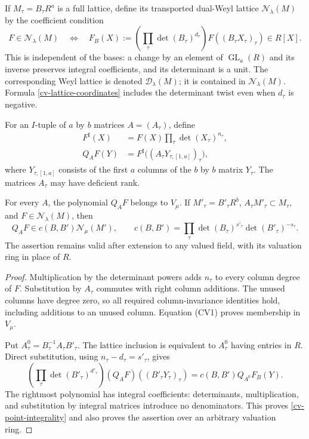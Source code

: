 If $M_\tau=B_\tau R^a$ is a full lattice, define its transported
dual-Weyl lattice $\mathcal N_\lambda(M)$ by the coefficient condition
\begin{equation}\label{cv-lattice-coordinates}
 F\in\mathcal N_\lambda(M)
 \quad\Longleftrightarrow\quad
 F_B(X):=\left(\prod_\tau\det(B_\tau)^{d_\tau}\right)
                       F((B_\tau X_\tau)_\tau)\in R[X].
\end{equation}
This is independent of the bases: a change by an element of
$\operatorname{GL}_a(R)$ and its inverse preserves integral
coefficients, and its determinant is a unit.  The corresponding Weyl
lattice is denoted $\mathcal D_\lambda(M)$; it is contained in
$\mathcal N_\lambda(M)$.  Formula
\eqref{cv-lattice-coordinates} includes the determinant twist even
when $d_\tau$ is negative.

For an $I$-tuple of $a$ by $b$ matrices $A=(A_\tau)$, define
\begin{equation}\label{cv-point-substitution}
 \begin{split}
 F^\sharp(X)&=F(X)\prod_\tau\det(X_\tau)^{n_\tau},\\
 Q_A F(Y)&=F^\sharp\bigl((A_\tau Y_{\tau,[1,a]})_\tau\bigr),
 \end{split}
\end{equation}
where $Y_{\tau,[1,a]}$ consists of the first $a$ columns of the $b$ by
$b$ matrix $Y_\tau$.  The matrices $A_\tau$ may have deficient rank.

\begin{lemma}\label{cv-substitution}
For every $A$, the polynomial $Q_AF$ belongs to $V_\mu$.
If $M'_{\tau}=B'_{\tau}R^b$, $A_\tau M'_\tau\subset M_\tau$,
and $F\in\mathcal N_\lambda(M)$, then
\begin{equation}\label{cv-point-integrality}
 Q_AF\in c(B,B')\mathcal N_\mu(M'),\qquad
 c(B,B')=\prod_\tau\det(B_\tau)^{s'_\tau}
                          \det(B'_\tau)^{-s_\tau}.
\end{equation}
The assertion remains valid after extension to any valued field,
with its valuation ring in place of $R$.
\end{lemma}
\begin{proof}
Multiplication by the determinant powers adds $n_\tau$ to every
column degree of $F$.  Substitution by $A_\tau$ commutes with right
column additions.  The unused columns have degree zero, so all
required column-invariance identities hold, including additions to an
unused column.  Equation (CV1) proves membership in $V_\mu$.

Put $A^0_\tau=B_\tau^{-1}A_\tau B'_\tau$.  The lattice inclusion is
equivalent to $A^0_\tau$ having entries in $R$.  Direct substitution,
using $n_\tau-d_\tau=s'_\tau$, gives
\begin{equation}\label{cv-exact-coordinate-factor}
 \left(\prod_\tau\det(B'_\tau)^{d'_\tau}\right)
                 (Q_AF)((B'_\tau Y_\tau)_\tau)
       =c(B,B')Q_{A^0}F_B(Y).
\end{equation}
The rightmost polynomial has integral coefficients: determinants,
multiplication, and substitution by integral matrices introduce no
denominators.  This proves \eqref{cv-point-integrality} and also proves
the assertion over an arbitrary valuation ring.
\end{proof}

